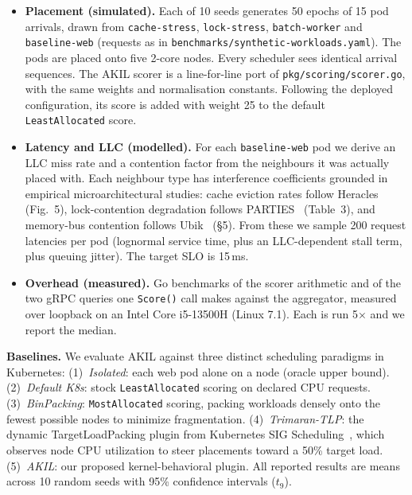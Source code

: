 \documentclass[10pt,conference,a4paper]{IEEEtran}
\newcommand{\akil}{\textsc{AKIL}\xspace}
\newcommand{\sys}{\akil}
\begin{document}
\begin{itemize}[leftmargin=*,topsep=1pt,itemsep=1pt]
  \item \textbf{Placement (simulated).} Each of 10 seeds generates 50 epochs of 15 pod
        arrivals, drawn from \texttt{cache-stress}, \texttt{lock-stress},
        \texttt{batch-worker} and \texttt{baseline-web} (requests as in
        \texttt{benchmarks/synthetic-workloads.yaml}). The pods are placed onto five
        2-core nodes. Every scheduler sees identical arrival sequences. The \sys scorer is a
        line-for-line port of \texttt{pkg/scoring/scorer.go}, with the same weights and
        normalisation constants. Following the deployed configuration, its score is
        added with weight 25 to the default \texttt{LeastAllocated} score.
  \item \textbf{Latency and LLC (modelled).} For each \texttt{baseline-web} pod we
        derive an LLC miss rate and a contention factor from the neighbours it was
        actually placed with. Each neighbour type has interference coefficients grounded in
        empirical microarchitectural studies: cache eviction rates follow Heracles~\cite{lo2015heracles}
        (Fig.~5), lock-contention degradation follows PARTIES~\cite{parties2019} (Table~3),
        and memory-bus contention follows Ubik~\cite{kasture2016ubik} (\S5). From these we
        sample 200 request latencies per pod (lognormal service time, plus an LLC-dependent
        stall term, plus queuing jitter). The target SLO is 15\,ms.
  \item \textbf{Overhead (measured).} Go benchmarks of the scorer arithmetic and of the two
        gRPC queries one \texttt{Score()} call makes against the aggregator, measured over
        loopback on an Intel Core i5-13500H (Linux 7.1). Each is run 5$\times$ and we
        report the median.
\end{itemize}

\textbf{Baselines.}
We evaluate \sys against three distinct scheduling paradigms in Kubernetes:
(1)~\emph{Isolated}: each web pod alone on a node (oracle upper bound).
(2)~\emph{Default K8s}: stock \texttt{LeastAllocated} scoring on declared CPU requests.
(3)~\emph{BinPacking}: \texttt{MostAllocated} scoring, packing workloads densely onto the
fewest possible nodes to minimize fragmentation.
(4)~\emph{Trimaran-TLP}: the dynamic TargetLoadPacking plugin from Kubernetes SIG
Scheduling~\cite{trimaran2021}, which observes node CPU utilization to steer placements toward a
50\% target load.
(5)~\emph{\sys}: our proposed kernel-behavioral plugin.
All reported results are means across 10 random seeds with 95\% confidence intervals ($t_{9}$).
\end{document}
